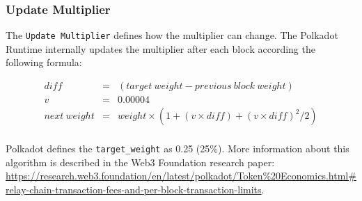 \documentclass[11pt,a4paper]{article}
\begin{document}
\subsubsection{Update Multiplier}
The \verb|Update Multiplier| defines how the multiplier can change. The Polkadot
Runtime internally updates the multiplier after each block according the
following formula:

\begin{eqnarray*}
diff &=& (target\ weight - previous\ block\ weight)\\
v &=& 0.00004\\
next\ weight &=& weight \times (1 + (v \times diff) + (v \times diff)^2 / 2)\\
\end{eqnarray*}

Polkadot defines the \verb|target_weight| as 0.25 (25\%). More information about
this algorithm is described in the Web3 Foundation research paper:
\url{https://research.web3.foundation/en/latest/polkadot/Token%20Economics.html#relay-chain-transaction-fees-and-per-block-transaction-limits}.
\end{document}
